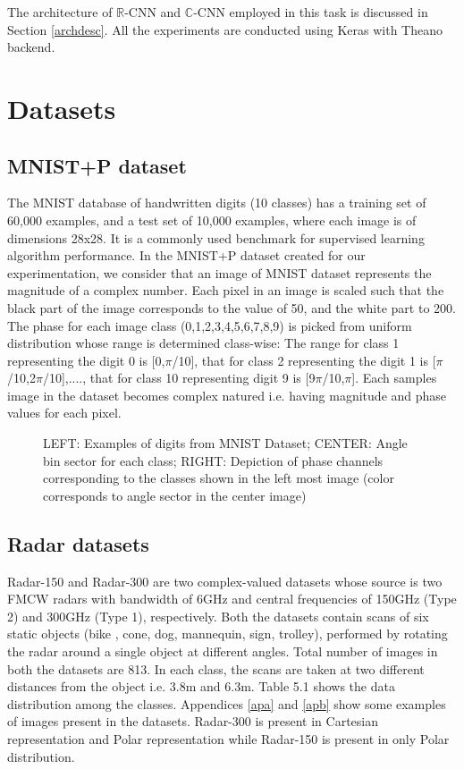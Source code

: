  The architecture of $\mathbb{R}$-CNN and $\mathbb{C}$-CNN employed in this task is discussed in Section \ref{archdesc}.  All the experiments are conducted using Keras \cite{chollet2015keras} with Theano \cite{theano} backend.
 
 
 \section{Datasets}\label{datasets}
 
 
 \subsection{MNIST+P dataset}\label{data-mnistp}
 The MNIST database of handwritten digits (10 classes) has a training set of 60,000 examples, and a test set of 10,000 examples, where each image is of dimensions 28x28. It is a commonly used benchmark for supervised learning algorithm performance. In the MNIST+P dataset created for our experimentation, we consider that an image of MNIST dataset represents the magnitude of a complex number. Each pixel in an image is scaled such that the black part of the image corresponds to the value of 50, and the white part to 200. The phase for each image class (0,1,2,3,4,5,6,7,8,9) is picked from uniform distribution whose range is determined class-wise: The range for class 1 representing the digit 0 is [0,$\pi$/10], that for class 2 representing the digit 1 is [$\pi$/10,2$\pi$/10],...., that for class 10 representing digit 9 is [9$\pi$/10,$\pi$]. Each samples image in the dataset becomes complex natured i.e. having magnitude and phase values for each pixel.
 
   \begin{figure}[htb]
	\centering
	\epsfxsize=14cm
	{}\caption{LEFT: Examples of digits from MNIST Dataset; CENTER: Angle bin sector for each class; RIGHT: Depiction of phase channels corresponding to the classes shown in the left most image (color corresponds to angle sector in the center image) \cite{mnistimage}}
\label{fig:blocks}
\end{figure}
 
 \subsection{Radar datasets}\label{data-radar}
 
 Radar-150 and Radar-300 are two complex-valued datasets whose source is two FMCW radars with bandwidth of 6GHz and central frequencies of 150GHz (Type 2) and 300GHz (Type 1), respectively.
 Both the datasets contain scans of six static objects (bike , cone, dog, mannequin, sign, trolley), performed by rotating the radar around a single object at different angles. Total number of images in both the datasets are 813. In each class, the scans are taken at two different distances from the object i.e. 3.8m and 6.3m. Table 5.1 shows the data distribution among the classes. Appendices \ref{apa} and \ref{apb} show some examples of images present in the datasets. Radar-300 is present in Cartesian representation and Polar representation while Radar-150 is present in only Polar distribution. 
 
